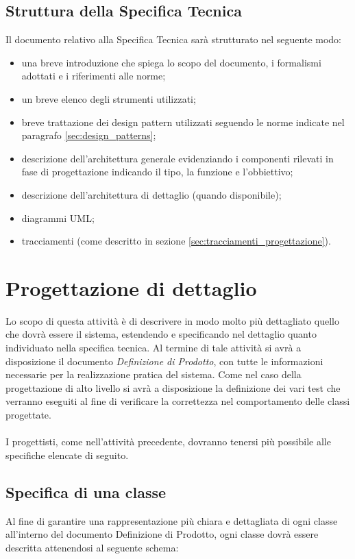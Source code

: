 {\subsection{Struttura della Specifica Tecnica}
Il documento relativo alla Specifica Tecnica sarà strutturato nel seguente modo:
\begin{itemize}
\item una breve introduzione che spiega lo scopo del documento, i formalismi adottati e i riferimenti alle norme;
\item un breve elenco degli strumenti utilizzati;
\item breve trattazione dei design pattern utilizzati seguendo le norme indicate nel paragrafo \ref{sec:design_patterns};
\item descrizione dell'architettura generale evidenziando i componenti rilevati in fase di progettazione indicando il tipo, la funzione e l'obbiettivo;
\item descrizione dell'architettura di dettaglio (quando disponibile);
\item diagrammi UML;
\item tracciamenti (come descritto in sezione \ref{sec:tracciamenti_progettazione}).
\end{itemize}

\section{Progettazione di dettaglio}
Lo scopo di questa attività è di descrivere in modo molto più dettagliato quello che dovrà essere il sistema, estendendo e specificando nel dettaglio quanto individuato nella specifica tecnica.
Al termine di tale attività si avrà a disposizione il documento \textit{Definizione di Prodotto}, con tutte le informazioni necessarie per la realizzazione pratica del sistema.
Come nel caso della progettazione di alto livello si avrà a disposizione la definizione dei vari test che verranno eseguiti al fine di verificare la correttezza nel comportamento delle classi progettate.\\\\
I progettisti, come nell'attività precedente, dovranno tenersi più possibile alle specifiche elencate di seguito.

\subsection{Specifica di una classe}
Al fine di garantire una rappresentazione più chiara e dettagliata di ogni classe all'interno del documento Definizione di Prodotto, ogni classe dovrà essere descritta attenendosi al seguente schema:

}
